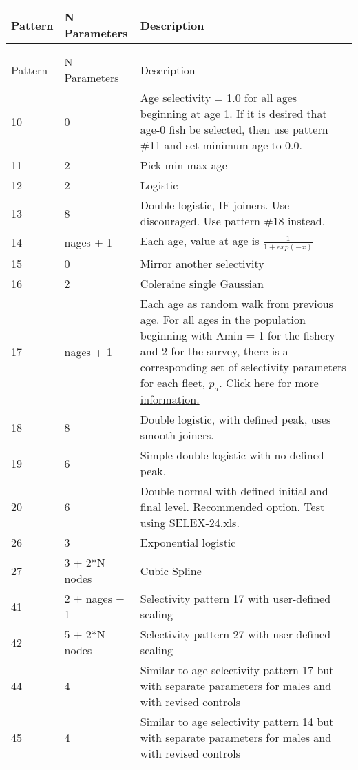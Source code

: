 \pagebreak
\begin{center}
	\begin{longtable}{p{2cm} p{3cm} p{10cm}}

		\endfirsthead

		\hline
		Pattern & N Parameters & Description \\
		\hline
		\endhead

		\endfoot
		\endlastfoot

		\hline
		\multicolumn{3}{c}{AGE BASED SELECTIVITY}\\
		   &   &  \\
		Pattern & N Parameters & Description \\
		\hline
		10 & 0 & Age selectivity = 1.0 for all ages beginning at age 1.  If it is desired that age-0 fish be selected, then use pattern \#11 and set minimum age to 0.0. \\
		11 & 2 & Pick min-max age\\
		12 & 2 & Logistic\\
		13 & 8 & Double logistic, IF joiners.  Use discouraged.  Use pattern \#18 instead.\\
		14 & nages + 1 & Each age, value at age is $\frac{1}{1+exp(-x)}$ \\
		15 & 0 & Mirror another selectivity\\
		16 & 2 & Coleraine single Gaussian\\
		17 & nages + 1 & Each age as random walk from previous age.  For all ages in the population beginning with Amin = 1 for the fishery and 2 for the survey, there is a corresponding set of selectivity parameters for each fleet, $p_a$. \hyperlink{RandWalk}{Click here for more information.}\\
		18 & 8 & Double logistic, with defined peak, uses smooth joiners.  \\
		19 & 6 & Simple double logistic with no defined peak.\\
		20 & 6 & Double normal with defined initial and final level.  Recommended option. Test using SELEX-24.xls.\\
		26 & 3 & Exponential logistic\\
		27 & 3 + 2*N nodes & Cubic Spline\\
		41 & 2 + nages + 1 & Selectivity pattern 17 with user-defined scaling \\
		42 & 5 + 2*N nodes & Selectivity pattern 27 with user-defined scaling \\
		44 & 4 & Similar to age selectivity pattern 17 but with separate parameters for males and with revised controls \\
		45 & 4 & Similar to age selectivity pattern 14 but with separate parameters for males and with revised controls \\
		\hline
	\end{longtable}
\end{center}


